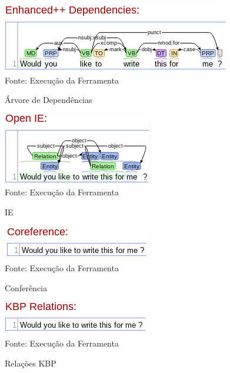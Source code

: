 \begin{figure}[H]
\centering
\caption{Árvore de Dependências} %
\includegraphics[scale=0.9]{06f}\\  %
{\small Fonte: Execução da Ferramenta} %
\label{fig:exemplo} %
\end{figure}

\begin{figure}[H]
\centering
\caption{IE} %
\includegraphics[scale=0.9]{07g}\\  %
{\small Fonte: Execução da Ferramenta} %
\label{fig:exemplo} %
\end{figure}

\begin{figure}[H]
\centering
\caption{Conferência} %
\includegraphics[scale=0.9]{08h}\\  %
{\small Fonte: Execução da Ferramenta} %
\label{fig:exemplo} %
\end{figure}

\begin{figure}[H]
\centering
\caption{Relações KBP} %
\includegraphics[scale=0.9]{10j}\\  %
{\small Fonte: Execução da Ferramenta} %
\label{fig:exemplo} %
\end{figure}


